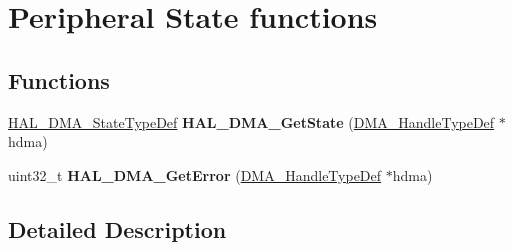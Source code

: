 \hypertarget{group___d_m_a___exported___functions___group3}{\section{Peripheral State functions}
\label{group___d_m_a___exported___functions___group3}
}
\subsection*{Functions}
\begin{DoxyCompactItemize}
\item 
\hypertarget{group___d_m_a___exported___functions___group3_gaef09509c41da57dc118c8ffb9533ce3f}{\hyperlink{group___d_m_a___exported___types_ga9c012af359987a240826f29073bbe463}{H\-A\-L\-\_\-\-D\-M\-A\-\_\-\-State\-Type\-Def} {\bfseries H\-A\-L\-\_\-\-D\-M\-A\-\_\-\-Get\-State} (\hyperlink{group___d_m_a___exported___types_ga92b907d56a9c29b93d46782a7a04f91e}{D\-M\-A\-\_\-\-Handle\-Type\-Def} $\ast$hdma)}\label{group___d_m_a___exported___functions___group3_gaef09509c41da57dc118c8ffb9533ce3f}

\item 
\hypertarget{group___d_m_a___exported___functions___group3_gabc0735694a0dd08e352b796d7fa7634f}{uint32\-\_\-t {\bfseries H\-A\-L\-\_\-\-D\-M\-A\-\_\-\-Get\-Error} (\hyperlink{group___d_m_a___exported___types_ga92b907d56a9c29b93d46782a7a04f91e}{D\-M\-A\-\_\-\-Handle\-Type\-Def} $\ast$hdma)}\label{group___d_m_a___exported___functions___group3_gabc0735694a0dd08e352b796d7fa7634f}

\end{DoxyCompactItemize}


\subsection{Detailed Description}
